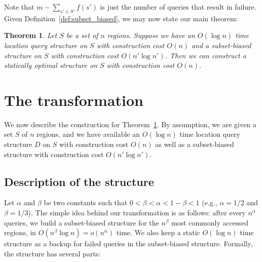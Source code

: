 \documentclass[11pt]{article}
\newtheorem{theorem}[figure]{Theorem}
\begin{document}
\noindent 
Note that $m - \sum_{s' \in S'} f(s')$ is just the number of queries 
that result in failure. Given Definition~\ref{def:subset_biased}, we may 
now state our main theorem:

\begin{theorem} \label{main} 
Let $S$ be a set of $n$ regions.
Suppose we
have an $O(\log n)$ time location query structure 
on $S$ with construction cost $O(n)$ and a subset-biased structure on $S$
with construction cost $O(n' \log n')$. Then we can construct
a statically optimal structure on $S$ with construction cost $O(n)$.  
\end{theorem}



\section{The transformation}

We now describe the construction for Theorem~\ref{main}. 
By assumption, we are given a set $S$ of $n$ regions, and we
have available an $O(\log n)$ time location query structure $D$ on $S$ with 
construction cost $O(n)$ as well as a 
subset-biased structure with construction 
cost $O(n' \log n')$.

\subsection{Description of the structure}

Let $\alpha$ and $\beta$ be two constants
such that $0<\beta<\alpha<1-\beta<1$ (e.g., $\alpha=1/2$ and
$\beta=1/3$).
The simple idea behind our transformation is as follows:
after every $n^\alpha$  queries, we build a subset-biased  
structure for the $n^\beta$ most commonly accessed regions,
in $O(n^\beta \log n) = o(n^\alpha)$ time.
We also keep a static $O(\log n)$ time structure as a backup for 
failed queries in the subset-biased structure.  
Formally, the structure has several parts:
\end{document}
